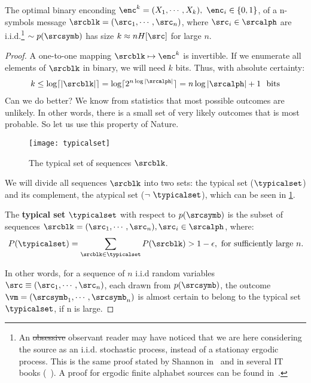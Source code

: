 \begin{theorem}\label{th:source_encoding}
	The optimal binary enconding \(\enc^{k}=(X_1, \cdots, X_k),~ \enc_i \in \{0,1\}\),  of a n-symbols message \(\srcblk=(\src_1, \cdots, \src_n)\), where \(\src_i \in \srcalph\) are i.i.d.\footnote{An \st{obsessive} observant reader may have noticed that we are here considering the source as an i.i.d. stochastic process, instead of a stationay ergodic process.  This is the same proof stated by Shannon in~\cite{shannon:1948} and in several \ac{IT} books (\eg~\cite{cover:2006,mackay:2002}). A proof for ergodic finite alphabet sources can be found in~\cite{mcmillan:1953}.} \(\sim p(\srcsymb)\) has size \(k \approx n H[\src]\) for large \(n\).
\end{theorem}
\begin{proof}
	A one-to-one mapping \(\srcblk \mapsto \enc^{k}\) is invertible. If we enumerate all elements of \(\srcblk\) in binary, we will need \(k\) bits. Thus, with absolute certainty:
	\begin{align}
		k\leq \log \lceil|\srcblk |\rceil = \log \lceil 2^{n \log |\srcalph|}\rceil = n \log |\srcalph|+1~\text{ bits}\label{eq:k_upperbound}
	\end{align}
	Can we do better? We know from statistics that most possible outcomes are unlikely. In other words, there is a small set of very likely outcomes that is most probable. So let us use this property of Nature.
	\begin{figure}
		[ht!] \centering
		\texttt{[image: typicalset]}
		\caption{The typical set of  sequences \(\srcblk\).}\label{fig:typical_atypical} \end{figure}

	We will divide all sequences \(\srcblk\) into two sets: the typical set (\(\typicalset\)) and its complement, the atypical set (\(\neg~ \typicalset\)), which can be seen in \cref{fig:typical_atypical}.

	\begin{definition}
		The \textbf{typical set} \(\typicalset\) with respect to \(p(\srcsymb)\) is the subset of sequences \(\srcblk=(\src_1,\cdots,\src_n ), \src_i \in \srcalph\), where:
		\begin{align}
			P(\typicalset)=\sum_{\srcblk \in \typicalset} P(\srcblk)> 1-\epsilon, \text{ for sufficiently large }n.\label{typical_set_definition}
		\end{align}
	\end{definition}
	In other words, for a sequence of \(n\) i.i.d random variables \(\src \equiv(\src_1,\cdots,\src_n )\), each drawn from \(p(\srcsymb)\), the outcome \(\vm=(\srcsymb_1, \cdots, \srcsymb_n)\) is almost certain to belong to the typical set \(\typicalset\), if n is large.


\end{proof}
